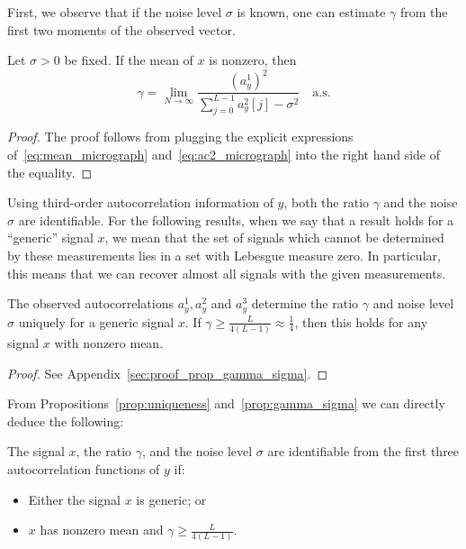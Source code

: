 \documentclass[9pt,twocolumn,twoside,lineno]{pnas-new}
\begin{document}
First, we observe that if the noise level $\sigma$ is known, one can estimate $\gamma$ from the first two moments of the observed vector.
%
\begin{proposition} \label{prop:gamma}
	Let $\sigma > 0$ be fixed. If the mean of $x$ is nonzero, then 
	\begin{equation*}
	\gamma = \lim_{N \to \infty}\frac{(a^1_y)^2}{\sum_{j=0}^{L-1}a_y^2[j]-\sigma^2} \quad \text{a.s.}
	\end{equation*}
\end{proposition}
\begin{proof}
	The proof follows from plugging the explicit expressions of~\eqref{eq:mean_micrograph} and~\eqref{eq:ac2_micrograph} into the right hand side of the equality.
\end{proof}

Using third-order autocorrelation information of $y$, both the ratio $\gamma$ and the noise $\sigma$ are identifiable. For the following results, when we say that a result holds for a ``generic'' signal $x$, we mean that the set of signals which cannot be determined by these measurements
lies in a set with Lebesgue measure zero. 
In particular, this means that we can recover
almost all signals with the given measurements.
%
\begin{proposition} \label{prop:gamma_sigma}
	The observed autocorrelations $a_y^1,a_y^2$ and  $a_y^3$ determine the ratio $\gamma$ and noise level $\sigma$ uniquely for a generic signal $x$. If $\gamma\geq\frac{L}{4(L-1)}\approx \frac{1}{4}$, then this holds for any signal $x$ with nonzero mean. 
	\begin{proof}
		See Appendix~\ref{sec:proof_prop_gamma_sigma}.
	\end{proof}
\end{proposition}

From Propositions~\ref{prop:uniqueness} and~\ref{prop:gamma_sigma} we can directly deduce the following:
\begin{corollary}
	 The signal $x$, the ratio $\gamma$, and the noise level $\sigma$ are identifiable from the first three autocorrelation functions of $y$ if:
	\begin{itemize}
		\item Either the signal $x$ is generic; or
		\item   $x$ has nonzero mean  and $\gamma\geq\frac{L}{4(L-1)}$.
	\end{itemize}
\end{corollary}
\end{document}
